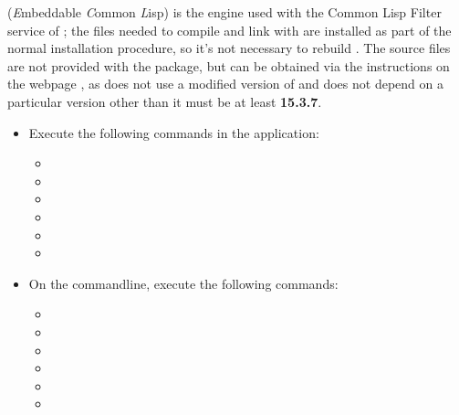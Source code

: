 \tertiaryEnd
\secondaryEnd
{}
\textbf{\ECL} (\textit{E}mbeddable \textit{C}ommon \textit{L}isp) is the
 engine used with the Common Lisp Filter service of \mplusm{}; the
files needed to compile and link with \textbf{\ECL} are installed as part of the normal
\mplusm{} installation procedure, so it's not necessary to rebuild \textbf{\ECL}.
The source files are not provided with the  package, but can be obtained
via the instructions on the web\longDash{}page
, as
\mplusm{} does not use a modified version of \textbf{\ECL} and does not depend on a
particular version \longDash{} other than it must be at least \textbf{15.3.7}.
\begin{itemize}
\item Execute the following commands in the  application:
\begin{itemize}
\item {}
\item\exSp{}
\item\exSp{}
\item\exSp{}
\item\exSp{}
\item\exSp{}
\end{itemize}
\item\exSp{}On the command\longDash{}line, execute the following commands:
\begin{itemize}
\item {}
\item\exSp{}
\item\exSp{}
\item\exSp{}
\item\exSp{}
\item\exSp{}
\end{itemize}
\end{itemize}
